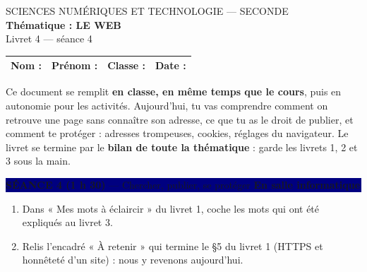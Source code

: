 \documentclass[11pt,a4paper]{article}
\newif\ifprof
\newcommand{\seance}[1]{%
  \par\addvspace{6pt}\noindent\colorbox{navy}{\parbox{\dimexpr\linewidth-2\fboxsep}{\color{white}#1}}\par\vspace{4pt}}
\begin{document}
\begin{center}
  {\small SCIENCES NUMÉRIQUES ET TECHNOLOGIE — SECONDE}\\[2pt]
  {\color{navy}\LARGE\bfseries Thématique : LE WEB}\\[2pt]
  {\color{navy}\large Livret 4 — séance 4\ifprof\ — \textcolor{corr}{version professeur}\fi}
\end{center}

\noindent\begin{tabularx}{\linewidth}{|Y|Y|Y|Y|}\hline
\textbf{Nom :} & \textbf{Prénom :} & \textbf{Classe :} & \textbf{Date :}\\\hline
\end{tabularx}

\medskip
Ce document se remplit \textbf{en classe, en même temps que le cours}, puis en autonomie pour les activités.
Aujourd'hui, tu vas comprendre comment on retrouve une page sans connaître son adresse, ce que tu as le droit de publier, et comment te protéger : adresses trompeuses, cookies, réglages du navigateur. Le livret se termine par le \textbf{bilan de toute la thématique} : garde les livrets 1, 2 et 3 sous la main.

\seance{\textbf{SÉANCE 4 (1 h 30)} — Chercher, publier, se protéger \hfill \textbf{En salle informatique}}

\begin{tcolorbox}[enhanced,colback=white,colframe=navy!60,boxrule=0.5pt,arc=2pt,left=5pt,right=5pt,top=4pt,bottom=4pt,
  title={\textbf{Avant de commencer}}, coltitle=navy, colbacktitle=bleuclair, fonttitle=\normalsize]
\begin{enumerate}[leftmargin=*,label=\textbf{\arabic*.}]
\item Dans « Mes mots à éclaircir » du livret 1, coche les mots qui ont été expliqués au livret 3.
\item Relis l'encadré « À retenir » qui termine le §5 du livret 1 (HTTPS et honnêteté d'un site) : nous y revenons aujourd'hui.
\end{enumerate}
\end{tcolorbox}
\end{document}
